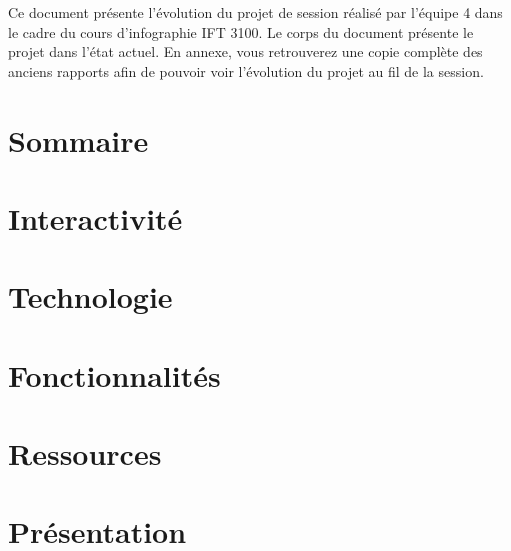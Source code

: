 \documentclass[ULlof]{ULrapport}
\begin{document}
	
Ce document présente l'évolution du projet de session réalisé par l'équipe 4 dans le cadre du cours d'infographie IFT 3100. Le corps du document présente le projet dans l'état actuel. En annexe, vous retrouverez une copie complète des anciens rapports afin de pouvoir voir l'évolution du projet au fil de la session.

\chapter{Sommaire}

\chapter{Interactivité}

\chapter{Technologie}

\chapter{Fonctionnalités}

\chapter{Ressources}

\chapter{Présentation}

\appendix
\end{document}
